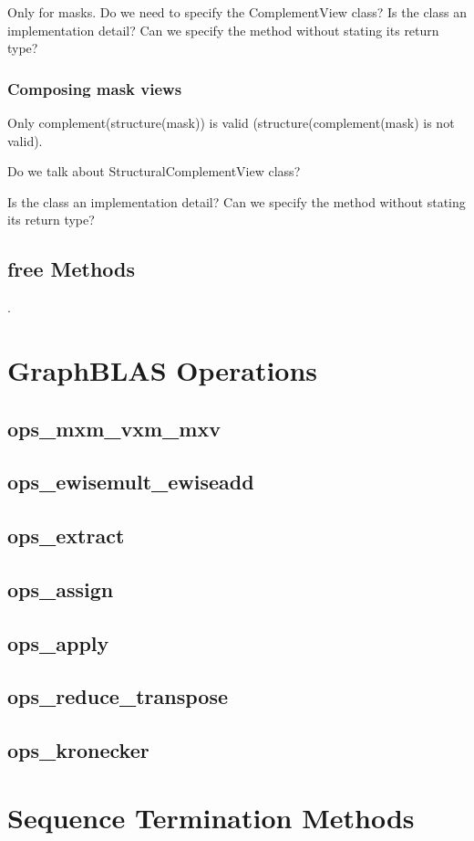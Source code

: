 Only for masks.  Do we need to specify the ComplementView class?
Is the class an implementation detail?  Can we specify the method without stating its return type?


\subsubsection{Composing mask views}

Only complement(structure(mask)) is valid  (structure(complement(mask) is not valid).

Do we talk about StructuralComplementView class?

Is the class an implementation detail?  Can we specify the method without stating its return type?

\subsection{{\sf free} Methods}

.

\section{GraphBLAS Operations}

\subsection{ops\_mxm\_vxm\_mxv}
\subsection{ops\_ewisemult\_ewiseadd}
\subsection{ops\_extract}
\subsection{ops\_assign} 
\subsection{ops\_apply}
\subsection{ops\_reduce\_transpose}
\subsection{ops\_kronecker}

\section{Sequence Termination Methods}